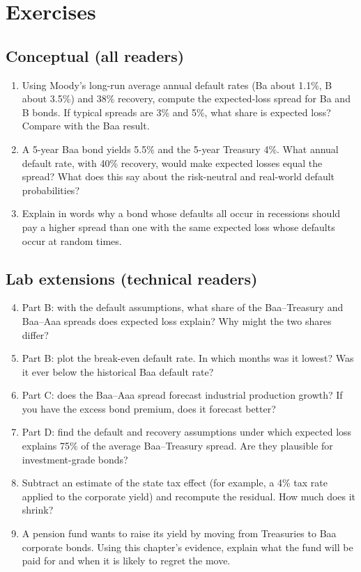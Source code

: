 \section*{Exercises}

\subsection*{Conceptual (all readers)}

\begin{enumerate}
  \item Using Moody's long-run average annual default rates (Ba about 1.1\%, B about 3.5\%) and 38\% recovery, compute the expected-loss spread for Ba and B bonds. If typical spreads are 3\% and 5\%, what share is expected loss? Compare with the Baa result.
  \item A 5-year Baa bond yields 5.5\% and the 5-year Treasury 4\%. What annual default rate, with 40\% recovery, would make expected losses equal the spread? What does this say about the risk-neutral and real-world default probabilities?
  \item Explain in words why a bond whose defaults all occur in recessions should pay a higher spread than one with the same expected loss whose defaults occur at random times.
\end{enumerate}

\subsection*{Lab extensions (technical readers)}

\begin{enumerate}
  \setcounter{enumi}{3}
  \item Part B: with the default assumptions, what share of the Baa--Treasury and Baa--Aaa spreads does expected loss explain? Why might the two shares differ?
  \item Part B: plot the break-even default rate. In which months was it lowest? Was it ever below the historical Baa default rate?
  \item Part C: does the Baa--Aaa spread forecast industrial production growth? If you have the excess bond premium, does it forecast better?
  \item Part D: find the default and recovery assumptions under which expected loss explains 75\% of the average Baa--Treasury spread. Are they plausible for investment-grade bonds?
  \item Subtract an estimate of the state tax effect (for example, a 4\% tax rate applied to the corporate yield) and recompute the residual. How much does it shrink?
  \item A pension fund wants to raise its yield by moving from Treasuries to Baa corporate bonds. Using this chapter's evidence, explain what the fund will be paid for and when it is likely to regret the move.
\end{enumerate}

